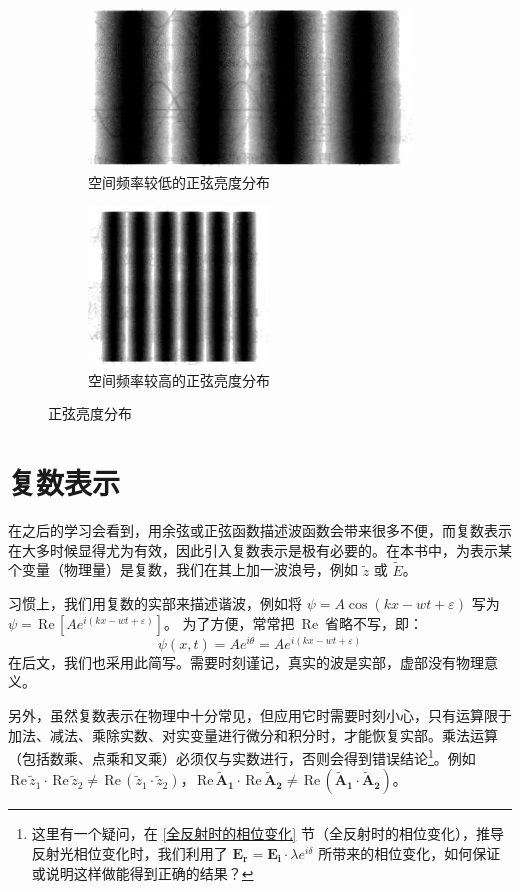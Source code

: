\documentclass[UTF8]{report}
\def\Re{\mathrm{\,Re}\,}
\theoremstyle{MyLineTheoremStyle} %
\theoremstyle{MyBlockTheoremStyle} %
\theoremstyle{MySubsubsectionStyle} %
\begin{document}
\begin{figure}[H]\centering
\begin{subfigure}[t]{0.62\columnwidth}\centering
    \includegraphics[height=120pt]{assets/1,2/image (41).jpg}
    \caption{ 空间频率较低的正弦亮度分布 }
\end{subfigure}\begin{subfigure}[t]{0.37\columnwidth}\centering
    \includegraphics[height=120pt]{assets/1,2/image (42).jpg}
    \caption{ 空间频率较高的正弦亮度分布 }
\end{subfigure}
\caption{ 正弦亮度分布 }
\end{figure}

\section{复数表示}
在之后的学习会看到，用余弦或正弦函数描述波函数会带来很多不便，而复数表示在大多时候显得尤为有效，因此引入复数表示是极有必要的。在本书中，为表示某个变量（物理量）是复数，我们在其上加一波浪号，例如 $\tilde{z}$ 或 $\tilde{E}$。

习惯上，我们用复数的实部来描述谐波，例如将 $\psi = A \cos(kx - wt + \varepsilon)$ 写为 $\psi = \Re [A e^{i (kx - wt + \varepsilon)}]$。
为了方便，常常把 $\Re$ 省略不写，即：
\begin{equation}
    \psi(x,t) = A e^{i \theta} = A e^{i (kx - wt + \varepsilon)}
\end{equation}
在后文，我们也采用此简写。需要时刻谨记，真实的波是实部，虚部没有物理意义。

另外，虽然复数表示在物理中十分常见，但应用它时需要时刻小心，只有运算限于加法、减法、乘除实数、对实变量进行微分和积分时，才能恢复实部。乘法运算（包括数乘、点乘和叉乘）必须仅与实数进行，否则会得到错误结论\footnote{这里有一个疑问，在 \ref{全反射时的相位变化} 节（全反射时的相位变化），推导反射光相位变化时，我们利用了 $\boldsymbol{E_r} = \boldsymbol{E_i}\cdot \lambda e^{i \delta} $ 所带来的相位变化，如何保证或说明这样做能得到正确的结果？}。例如 $\Re \tilde{z}_1 \cdot \Re \tilde{z}_2 \ne \Re (\tilde{z}_1\cdot \tilde{z}_2)$，$\Re \boldsymbol{\tilde{A}_1 }\cdot \Re \boldsymbol{\tilde{A}_2 }\ne \Re (\boldsymbol{\tilde{A}_1} \cdot \boldsymbol{\tilde{A}_2})$。
\end{document}
